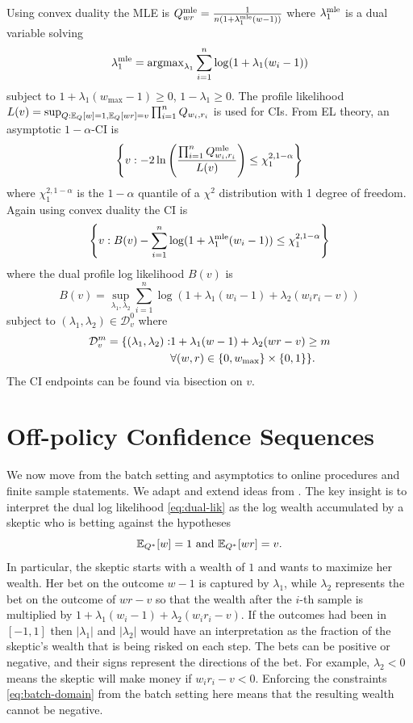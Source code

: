 Using convex duality the MLE is
$
Q^{\textrm{mle}}_{wr} = \frac{1}{n(1+\lambda_1^{\textrm{mle}}(w-1))}
$
where $\lambda_1^{\textrm{mle}}$ is a dual variable solving
\[
\lambda_1^{\textrm{mle}} = \operatorname{argmax}_{\lambda_1} \sum_{i=1}^n \log(1+\lambda_1(w_i-1))
\]
subject to $1+\lambda_1(w_{\max}-1)\geq 0$, $1-\lambda_1\geq 0$.
The profile likelihood
$
L(v)=\sup_{Q: \mathbb{E}_Q[w]=1, \mathbb{E}_Q[wr]=v} \prod_{i=1}^n Q_{w_i,r_i}
$
is used for CIs. From EL theory,
an asymptotic $1-\alpha$-CI is
\[
\left\{v: -2\ln\left(\frac{\prod_{i=1}^n Q^{\textrm{mle}}_{w_i,r_i}}{L(v)}\right)
\leq \chi_1^{2,1-\alpha}\right\}
\]
where $\chi_1^{2,1-\alpha}$ is the $1-\alpha$ quantile of a $\chi^2$
distribution with 1 degree of freedom.
Again using convex duality the CI is
\[
\left\{v: 
B(v)-\sum_{i=1}^n\log(1+\lambda_1^{\textrm{mle}}(w_i-1))
\leq \chi_1^{2,1-\alpha}\right\}
\]
where the dual profile log likelihood $B(v)$ is
\begin{equation}
B(v) = \sup_{\lambda_1,\lambda_2} \sum_{i=1}^n \log(1+\lambda_1(w_i-1)+\lambda_2(w_i r_i -v))    \label{eq:dual-lik}
\end{equation}
subject to $(\lambda_1,\lambda_2) \in \mathcal{D}_v^0$ where 
\begin{align}
\mathcal{D}_v^{m} =
\{(\lambda_1,\lambda_2): & 1+\lambda_1(w-1)+\lambda_2(wr-v)\geq m \label{eq:batch-domain}\\
                         & \forall (w,r) \in \{0,w_{\max}\}\times \{0,1\} \notag
\}.
\end{align}
The CI endpoints can be found via 
bisection on $v$.

\section{Off-policy Confidence Sequences}
We now move from the batch setting and asymptotics to
online procedures and finite sample statements.
We adapt and extend ideas from \cite{waudby-smith_variance-adaptive_2020}.
The key insight is to interpret the 
dual log likelihood \eqref{eq:dual-lik}
as the log wealth accumulated by a skeptic who is betting against the
hypotheses 
\[
\mathbb{E}_{Q^*}[w]=1 \text{ and } \mathbb{E}_{Q^*}[wr]=v.
\]
In particular,
the skeptic starts with a wealth of $1$ and wants to 
maximize her wealth. Her bet on the outcome $w-1$ is captured by $\lambda_1$, while $\lambda_2$
represents the bet on the outcome of $wr-v$ so that the wealth after
the $i$-th sample is multiplied by $1+\lambda_1(w_i-1)+\lambda_2 (w_i r_i -v)$. If the outcomes had been in $[-1,1]$ then
$|\lambda_1|$ and $|\lambda_2|$ would have an interpretation as 
the fraction of the skeptic's wealth that is being risked 
on each step. The bets can be positive
or negative, and their signs represent the directions of the bet. For example, $\lambda_2<0$ means 
the skeptic will make money if $w_ir_i-v<0$.
Enforcing the constraints 
\eqref{eq:batch-domain}
from the batch setting here means that 
the resulting wealth cannot be negative.



